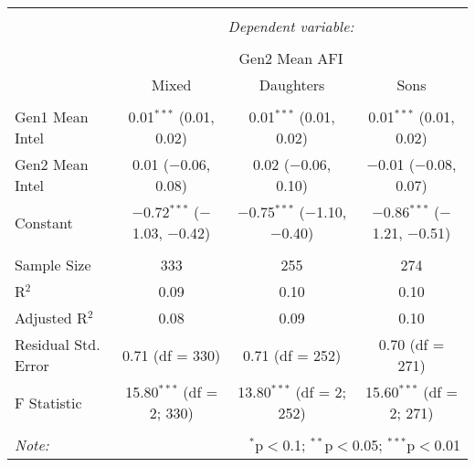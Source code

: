 
\begingroup 
\small 
\begin{tabular}{@{\extracolsep{1pt}}lccc} 
\\[-1.8ex]\hline 
\hline \\[-1.8ex] 
 & \multicolumn{3}{c}{\textit{Dependent variable:}} \\ 
\cline{2-4} 
\\[-1.8ex] & \multicolumn{3}{c}{Gen2 Mean AFI} \\ 
 & Mixed & Daughters & Sons \\ 
\hline \\[-1.8ex] 
 Gen1 Mean Intel & 0.01$^{***}$ (0.01, 0.02) & 0.01$^{***}$ (0.01, 0.02) & 0.01$^{***}$ (0.01, 0.02) \\ 
  Gen2 Mean Intel & 0.01 ($-$0.06, 0.08) & 0.02 ($-$0.06, 0.10) & $-$0.01 ($-$0.08, 0.07) \\ 
  Constant & $-$0.72$^{***}$ ($-$1.03, $-$0.42) & $-$0.75$^{***}$ ($-$1.10, $-$0.40) & $-$0.86$^{***}$ ($-$1.21, $-$0.51) \\ 
 \hline \\[-1.8ex] 
Sample Size & 333 & 255 & 274 \\ 
R$^{2}$ & 0.09 & 0.10 & 0.10 \\ 
Adjusted R$^{2}$ & 0.08 & 0.09 & 0.10 \\ 
Residual Std. Error & 0.71 (df = 330) & 0.71 (df = 252) & 0.70 (df = 271) \\ 
F Statistic & 15.80$^{***}$ (df = 2; 330) & 13.80$^{***}$ (df = 2; 252) & 15.60$^{***}$ (df = 2; 271) \\ 
\hline 
\hline \\[-1.8ex] 
\textit{Note:}  & \multicolumn{3}{r}{$^{*}$p$<$0.1; $^{**}$p$<$0.05; $^{***}$p$<$0.01} \\ 
\end{tabular} 
\endgroup 
